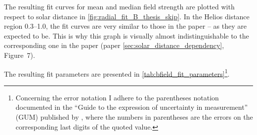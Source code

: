The resulting fit curves for mean and median field strength are plotted with respect to solar distance in \autoref{fig:radial_fit_B_thesis_skip}. In the Helios distance region \SIrange{0.3}{1.0}{\au}, the fit curves are very similar to those in the paper -- as they are expected to be. This is why this graph is visually almost indistinguishable to the corresponding one in the paper (paper \autoref{sec:solar_distance_dependency}, Figure~7).
\begin{figure}[htb]
\end{figure}
The resulting fit parameters are presented in \autoref{tab:bfield_fit_parameters}\footnote{
Concerning the error notation I adhere to the parentheses notation documented in the ``Guide to the expression of uncertainty in measurement'' (GUM) published by \citet{GUM2008}, where the numbers in parentheses are the errors on the corresponding last digits of the quoted value.
}.\\
